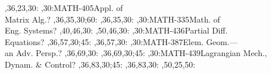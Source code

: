 \documentclass{article}
\begin{document}
\begin{chart}
  ,36,23,30:
,30:{MATH-405}{Appl. of\\Matrix Alg.}{?}
  ,36,35,30;60:
  ,36,35,30:
,30:{MATH-335}{Math. of\\Eng. Systems}{?}
  ,40,46,30:
  ,50,46,30:
,30:{MATH-436}{Partial Diff.\\Equations}{?}
  ,36,57,30;45:
  ,36,57,30:
,30:{MATH-387}{Elem. Geom.---\\an Adv. Persp.}{?}
  ,36,69,30:
  ,36,69,30;45:
,30:{MATH-439}{Lagrangian Mech.,\\Dynam. \& Control}{?}
  ,36,83,30;45:
  ,36,83,30:
  ,50,25,50:
\end{chart}
\end{document}
